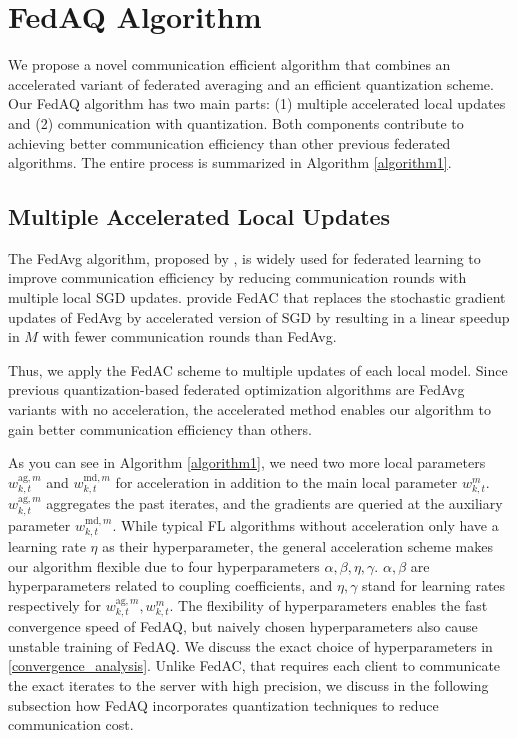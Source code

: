 \section{FedAQ Algorithm}

We propose a novel communication efficient algorithm that combines an accelerated variant of federated averaging and an efficient quantization scheme. Our FedAQ algorithm has two main parts: (1) multiple accelerated local updates and (2) communication with quantization. Both components contribute to achieving better communication efficiency than other previous federated algorithms. The entire process is summarized in Algorithm \ref{algorithm1}. %

\subsection{Multiple Accelerated Local Updates}

The FedAvg algorithm, proposed by \cite{mcmahan2017communication}, is widely used for federated learning to improve communication efficiency by reducing communication rounds with multiple local SGD updates. \cite{yuan2020federated} provide FedAC that replaces the stochastic gradient updates of FedAvg by accelerated version of SGD by \cite{ghadimi2012optimal} resulting in a linear speedup in $M$ with fewer communication rounds than FedAvg.

Thus, we apply the FedAC scheme to multiple updates of each local model. Since previous quantization-based federated optimization algorithms are FedAvg variants with no acceleration, the accelerated method enables our algorithm to gain better communication efficiency than others.

As you can see in Algorithm \ref{algorithm1}, we need two more local parameters $w_{k, t}^{\textrm{ag}, m}$ and $w_{k, t}^{\textrm{md}, m}$ for acceleration in addition to the main local parameter $w_{k, t}^m$. $w_{k,t}^{\textrm{ag},m}$ aggregates the past iterates, and the gradients are queried at the auxiliary parameter $w_{k,t}^{\textrm{md},m}$. While typical FL algorithms without acceleration only have a learning rate $\eta$ as their hyperparameter, the general acceleration scheme makes our algorithm flexible due to four hyperparameters $\alpha, \beta, \eta, \gamma$. $\alpha, \beta$ are hyperparameters related to coupling coefficients, and $\eta, \gamma$ stand for learning rates respectively for $w_{k, t}^{\textrm{ag}, m}, w_{k, t}^m$. The flexibility of hyperparameters enables the fast convergence speed of FedAQ, but naively chosen hyperparameters also cause unstable training of FedAQ. We discuss the exact choice of hyperparameters in \cref{convergence_analysis}. Unlike FedAC, that requires each client to communicate the exact iterates to the server with high precision, we discuss in the following subsection how FedAQ incorporates quantization techniques to reduce communication cost.


